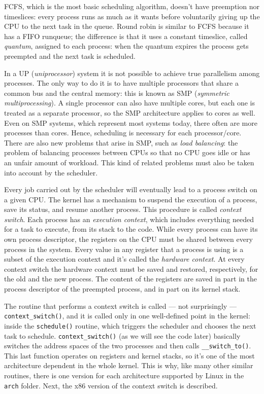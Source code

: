 \documentclass[10pt, oneside]{book}
\begin{document}
FCFS, which is the most basic scheduling algorithm, doesn't have preemption nor timeslices: every process  runs as much as it wants before voluntarily giving up the CPU to the next task in the queue. Round robin is similar to FCFS because it has a FIFO runqueue; the difference is that it uses a constant timeslice, called \textit{quantum}, assigned to each process: when the quantum expires the process gets preempted and the next task is scheduled.

In a UP (\textit{uniprocessor}) system it is not possible to achieve true parallelism among processes. The only way to do it is to have multiple processors that share a common bus and the central memory: this is known as SMP (\textit{symmetric multiprocessing}). A single processor can also have multiple cores, but each one is treated as a separate processor, so the SMP architecture applies to cores as well. Even on SMP systems, which represent most systems today, there often are more processes than cores. Hence, scheduling is necessary for each processor/core. There are also new problems that arise in SMP, such as \textit{load balancing}: the problem of balancing processes between CPUs so that no CPU goes idle or has an unfair amount of workload. This kind of related problems must also be taken into account by the scheduler.

Every job carried out by the scheduler will eventually lead to a process switch on a given CPU. The kernel has a mechanism to suspend the execution of a process, save its status, and resume another process. This procedure is called \textit{context switch}. Each process has an \textit{execution context}, which includes everything needed for a task to execute, from its stack to the code. While every process can have its own process descriptor, the registers on the CPU must be shared between every process in the system. Every value in any register that a process is using is a subset of the execution context and it's called the \textit{hardware context}. At every context switch the hardware context must be saved and restored, respectively, for the old and the new process. The content of the registers are saved in part in the process descriptor of the preempted process, and in part on its kernel stack.

The routine that performs a context switch is called --- not surprisingly --- \verb|context_switch()|, and it is called only in one well-defined point in the kernel: inside the \verb|schedule()| routine, which triggers the scheduler and chooses the next task to schedule. \verb|context_switch()| (as we will see the code later) basically switches the address spaces of the two processes and then calls \verb|__switch_to()|. This last function operates on registers and kernel stacks, so it's one of the most architecture dependent in the whole kernel. This is why, like many other similar routines, there is one version for each architecture supported by Linux in the \verb|arch| folder. Next, the x86 version of the context switch is described.
\end{document}
